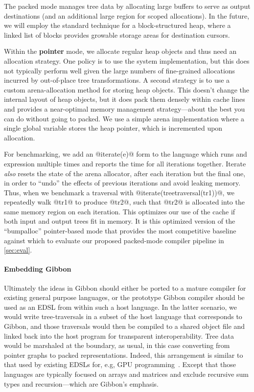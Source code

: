 \documentclass[a4paper,english]{lipics-v2016}
\newcommand{\treelang}{Gibbon\xspace} %
\begin{document}
The packed mode manages tree data by allocating large buffers to serve as output
destinations (and an additional large region for scoped allocations).  In the
future, we will employ the standard technique for a block-structured heap, where a
linked list of blocks provides growable storage areas for destination cursors.


Within the {\bf pointer} mode, we allocate regular heap objects and thus need an
allocation strategy.  One policy is to use the system 
implementation, but this does not typically perform well given the large numbers
of fine-grained allocations incurred by out-of-place tree transformations.
%
A second strategy is to use a custom arena-allocation method for storing heap
objects.  This doesn't change the internal layout of heap objects, but it does
pack them densely within cache lines and provides a near-optimal memory
management strategy---about the best you can do without going to packed.
%
We use a simple arena implementation where a single global variable stores the
heap pointer, which is incremented upon allocation.

For benchmarking, we add an @iterate(e)@ form to the language which runs and
expression multiple times and reports the time for all iterations together.
Iterate {\em also} resets the state of the arena allocator, after each iteration
but the final one, in order to ``undo'' the effects of previous iterations
and avoid leaking memory.
%
Thus, when we benchmark a traversal with @iterate(treetraversal(tr1))@, we
repeatedly walk @tr1@ to produce @tr2@, such that @tr2@ is allocated into the
same memory region on each iteration.  This optimizes our use of the cache if
both input and output trees fit in memory.
%
It is this optimized version of the ``bumpalloc'' pointer-based mode that
provides the most competitive baseline against which to evaluate our proposed
packed-mode compiler pipeline in \cref{sec:eval}.


\paragraph*{Embedding Gibbon}

Ultimately the ideas in Gibbon should either be ported to a mature compiler for
existing general purpose languages, or the prototype Gibbon compiler should be
used as an EDSL from within such a host language.
%
In the latter scenario, we would write tree-traversals in a subset of the host
language that corresponds to Gibbon, and those traversals would then be compiled
to a shared object file and linked back into the host program for transparent
interoperability.  Tree data would be marshaled at the boundary, as usual, in
this case converting from pointer graphs to packed representations.
%
Indeed, this arrangement is similar to that used by existing EDSLs for, e.g, GPU
programming~\cite{accelerate-icfp13,delite,obsidian-cacm}.  Except that those languages are
typically focused on arrays and matrices and exclude recursive sum types and
recursion---which are \treelang's emphasis.
\end{document}
